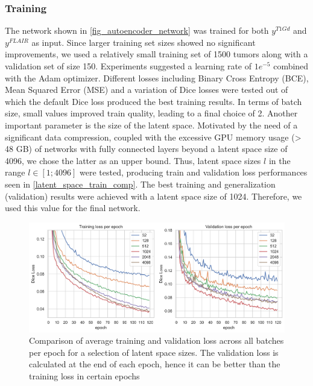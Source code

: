 \subsubsection{Training}\label{autoencoder_training}
The network shown in \autoref{fig_autoencoder_network} was trained for both $y^{T1Gd}$ and $y^{FLAIR}$ as input. Since larger training set sizes showed no significant improvements, we used a relatively small training set of 1500 tumors along with a validation set of size 150.
Experiments suggested a learning rate of $1e^{-5}$ combined with the Adam optimizer. Different losses including Binary Cross Entropy (BCE), Mean Squared Error (MSE) and a variation of Dice losses were tested out of which the default Dice loss produced the best training results.
In terms of batch size, small values improved train quality, leading to a final choice of 2.
Another important parameter is the size of the latent space. Motivated by the need of a significant data compression, coupled with the excessive GPU memory usage (> 48 GB) of networks with fully connected layers beyond a latent space size of 4096, we chose the latter as an upper bound. Thus, latent space sizes $l$ in the range $l \in[1; 4096]$ were tested, producing train and validation loss performances seen in \autoref{latent_space_train_comp}. The best training and generalization (validation) results were achieved with a latent space size of 1024. Therefore, we used this value for the final network.        

\begin{figure}[htbp]
  \centering
  \includegraphics[width=450pt]{figures/ae_latent_space_train_comp}
  \caption{Comparison of average training and validation loss across all batches per epoch for a selection of latent space sizes. The validation loss is calculated at the end of each epoch, hence it can be better than the training loss in certain epochs}\label{latent_space_train_comp}
\end{figure}

